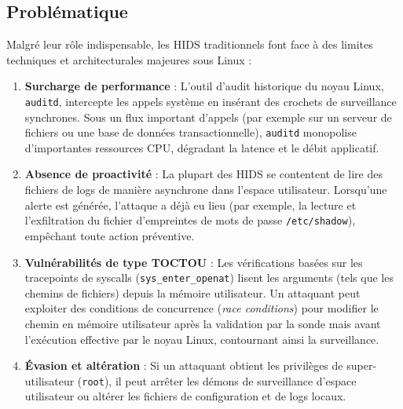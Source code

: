 \documentclass[11pt,a4paper]{article}
\begin{document}
\subsection{Problématique}
Malgré leur rôle indispensable, les HIDS traditionnels font face à des limites techniques et architecturales majeures sous Linux :
\begin{enumerate}
    \item \textbf{Surcharge de performance} : L'outil d'audit historique du noyau Linux, \texttt{auditd}, intercepte les appels système en insérant des crochets de surveillance synchrones. Sous un flux important d'appels (par exemple sur un serveur de fichiers ou une base de données transactionnelle), \texttt{auditd} monopolise d'importantes ressources CPU, dégradant la latence et le débit applicatif.
    \item \textbf{Absence de proactivité} : La plupart des HIDS se contentent de lire des fichiers de logs de manière asynchrone dans l'espace utilisateur. Lorsqu'une alerte est générée, l'attaque a déjà eu lieu (par exemple, la lecture et l'exfiltration du fichier d'empreintes de mots de passe \texttt{/etc/shadow}), empêchant toute action préventive.
    \item \textbf{Vulnérabilités de type TOCTOU} : Les vérifications basées sur les tracepoints de syscalls (\texttt{sys\_enter\_openat}) lisent les arguments (tels que les chemins de fichiers) depuis la mémoire utilisateur. Un attaquant peut exploiter des conditions de concurrence (\textit{race conditions}) pour modifier le chemin en mémoire utilisateur après la validation par la sonde mais avant l'exécution effective par le noyau Linux, contournant ainsi la surveillance.
    \item \textbf{Évasion et altération} : Si un attaquant obtient les privilèges de super-utilisateur (\texttt{root}), il peut arrêter les démons de surveillance d'espace utilisateur ou altérer les fichiers de configuration et de logs locaux.
\end{enumerate}
\end{document}
